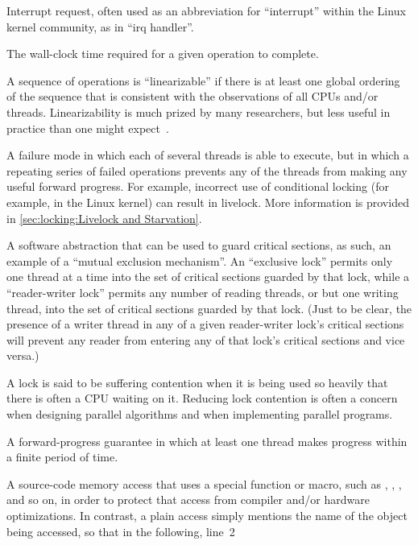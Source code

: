 \begin{description}
	Interrupt request, often used as an abbreviation for ``interrupt''
	within the Linux kernel community, as in ``irq handler''.
\item[\IXG{Latency}:]
	The wall-clock time required for a given operation to complete.
\item[\IXG{Linearizable}:]
	A sequence of operations is ``linearizable'' if there is at
	least one global ordering of the sequence that is consistent
	with the observations of all CPUs and/or threads.
	Linearizability is much prized by many researchers, but less
	useful in practice than one might
	expect~\cite{AndreasHaas2012FIFOisnt}.
\item[\IXG{Livelock}:]
	A failure mode in which each of several threads is able to
	execute, but in which a repeating series of failed operations
	prevents any of the threads from making any useful forward progress.
	For example, incorrect use of conditional locking
	(for example,  in the Linux kernel)
	can result in livelock.
	More information is provided in
	\cref{sec:locking:Livelock and Starvation}.
\item[\IXG{Lock}:]
	A software abstraction that can be used to guard critical sections,
	as such, an example of a ``mutual exclusion mechanism''.
	An ``exclusive lock'' permits only one thread at a time into the
	set of critical sections guarded by that lock, while a
	``reader-writer lock'' permits any number of reading
	threads, or but one writing thread, into the set of critical
	sections guarded by that lock.
	(Just to be clear, the presence	of a writer thread in any of
	a given reader-writer lock's critical sections will prevent
	any reader from entering any of that lock's critical sections
	and vice versa.)
\item[\IXG{Lock Contention}:]
	A lock is said to be suffering contention when it is being
	used so heavily that there is often a CPU waiting on it.
	Reducing lock contention is often a concern when designing
	parallel algorithms and when implementing parallel programs.
\item[\IXG{Lock Free}:]
	A forward-progress guarantee in which at least one thread makes
	progress within a finite period of time.
\item[\IXG{Marked Access}:]
	A source-code memory access that uses a special function or
	macro, such as , ,
	, and so on, in order to protect that access
	from compiler and/or hardware optimizations.
	In contrast, a plain access simply mentions the name of
	the object being accessed, so that in the following, line~2

\end{description}
